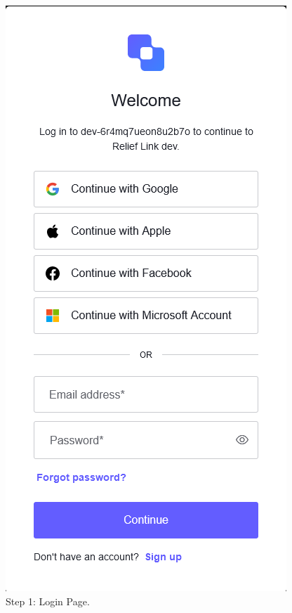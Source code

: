 \documentclass[conference]{IEEEtran}
\begin{document}
\begin{figure}[htbp]
    \centerline{\includegraphics[width=\linewidth]{./figures/login.png}}
    \caption{Step 1: Login Page.}
    \label{fig:login}
\end{figure}
\end{document}
